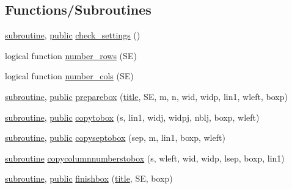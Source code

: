 \subsection*{Functions/\+Subroutines}
\begin{DoxyCompactItemize}
\item 
\hyperlink{M__stopwatch_83_8txt_acfbcff50169d691ff02d4a123ed70482}{subroutine}, \hyperlink{M__stopwatch_83_8txt_a2f74811300c361e53b430611a7d1769f}{public} \hyperlink{namespacem__display__util_ad15e85a03cd2a7ef8f405fbb9c1061af}{check\+\_\+settings} ()
\item 
logical function \hyperlink{namespacem__display__util_a7a886d21010f7a6f0f8101d2b26fd97d}{number\+\_\+rows} (SE)
\item 
logical function \hyperlink{namespacem__display__util_a837cfbf5c0d097da743220ac0acfaec8}{number\+\_\+cols} (SE)
\item 
\hyperlink{M__stopwatch_83_8txt_acfbcff50169d691ff02d4a123ed70482}{subroutine}, \hyperlink{M__stopwatch_83_8txt_a2f74811300c361e53b430611a7d1769f}{public} \hyperlink{namespacem__display__util_a70f3818ca97ec91537e81b9f9b10953c}{preparebox} (\hyperlink{print__watch_83_8txt_a15b5bd21156bb9fca6a755ab8c029a9c}{title}, SE, m, n, wid, widp, lin1, wleft, boxp)
\item 
\hyperlink{M__stopwatch_83_8txt_acfbcff50169d691ff02d4a123ed70482}{subroutine}, \hyperlink{M__stopwatch_83_8txt_a2f74811300c361e53b430611a7d1769f}{public} \hyperlink{namespacem__display__util_aca56756281a372cd4d186a032dd426fb}{copytobox} (s, lin1, widj, widpj, nblj, boxp, wleft)
\item 
\hyperlink{M__stopwatch_83_8txt_acfbcff50169d691ff02d4a123ed70482}{subroutine}, \hyperlink{M__stopwatch_83_8txt_a2f74811300c361e53b430611a7d1769f}{public} \hyperlink{namespacem__display__util_ab8090500f628c3475b88b0068c6788a4}{copyseptobox} (sep, m, lin1, boxp, wleft)
\item 
\hyperlink{M__stopwatch_83_8txt_acfbcff50169d691ff02d4a123ed70482}{subroutine} \hyperlink{namespacem__display__util_a43abab0fd2426042dc21b42e638210a8}{copycolumnnumberstobox} (s, wleft, wid, widp, lsep, boxp, lin1)
\item 
\hyperlink{M__stopwatch_83_8txt_acfbcff50169d691ff02d4a123ed70482}{subroutine}, \hyperlink{M__stopwatch_83_8txt_a2f74811300c361e53b430611a7d1769f}{public} \hyperlink{namespacem__display__util_a056732cc150994b9abe25ed0d72ebee4}{finishbox} (\hyperlink{print__watch_83_8txt_a15b5bd21156bb9fca6a755ab8c029a9c}{title}, SE, boxp)
\item 

\end{DoxyCompactItemize}
